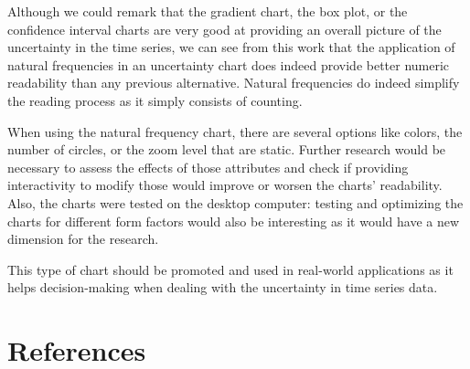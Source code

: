 \documentclass[a4paper,3p,sort&compress]{elsarticle}
\begin{document}
Although we could remark that the gradient chart, the box plot, or the confidence interval charts are very good at
providing an overall picture of the uncertainty in the time series, we can see from this work that the application of natural
frequencies in an uncertainty chart does indeed
provide better numeric readability than any previous alternative. Natural frequencies do indeed simplify
the reading process as it simply consists of counting.

When using the natural frequency chart, there are several options like colors, the number of circles, or the
zoom level that are static. Further research would be necessary to assess the effects of those
attributes and check if providing interactivity to modify those would improve or worsen the charts' readability.
Also, the charts were tested on the desktop computer: testing and optimizing the charts for different form factors
would also be interesting as it would have a new dimension for the research.

This type of chart should be promoted and used in real-world applications as it helps decision-making when
dealing with the uncertainty in time series data.

\section{References}
\label{sec:ref}



\end{document}
